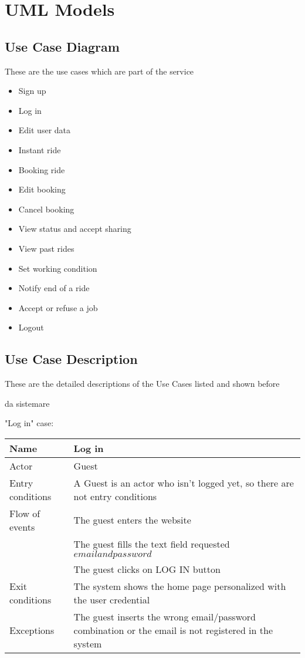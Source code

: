 \section{UML Models}

\subsection{Use Case Diagram}
These are the use cases which are part of the service
\begin{itemize}
	\item Sign up
	\item Log in
	\item Edit user data
	\item Instant ride
	\item Booking ride
	\item Edit booking
	\item Cancel booking
	\item View status and accept sharing
	\item View past rides
	\item Set working condition
	\item Notify end of a ride
	\item Accept or refuse a job
	\item Logout
	
	
	
\end{itemize}
\subsection{Use Case Description}
These are the detailed descriptions of the Use Cases listed and shown before
\begin{Huge} da sistemare 
\end{Huge}

"Log in" case:

\begin{tabular}{|l|l|} 
\hline
Name & Log in\\
\hline
Actor & Guest\\
\hline
Entry conditions & A Guest is an actor who isn't logged yet, so there are not entry conditions\\
\hline
Flow of events
			&	\tabitem The guest enters the website\\
			&	\tabitem The guest fills the text field requested \(email and password\)\\
			&	\tabitem The guest clicks on LOG IN button\\
\hline
Exit conditions & The system shows the home page personalized with the user credential\\
\hline
Exceptions & The guest inserts the wrong email/password combination or the email is not registered in the system\\
\hline
\end {tabular}

